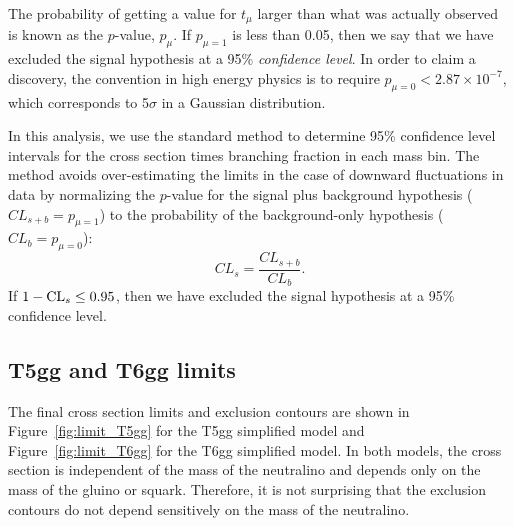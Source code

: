 The probability of getting a value for $t_\mu$ larger than what was actually observed is known as the $p$-value, 
$p_\mu$. If $p_{\mu=1}$ is less than 0.05, then we say that we have excluded the signal hypothesis at a 95\% 
\textit{confidence level}. In order to claim a discovery, the convention in high energy physics is to require
$p_{\mu =0} < 2.87 \times 10^{-7}$, which corresponds to 5$\sigma$ in a Gaussian distribution. 

In this analysis, we use the standard \cls method \cite{Junk:1999kv, Read:2002hq} to 
determine 95\% confidence level intervals for the cross section times branching fraction in each mass bin.
The \cls method avoids over-estimating the limits in the case of downward fluctuations in data by
normalizing the $p$-value for the signal plus background hypothesis ($CL_{s+b} = p_{\mu=1}$) to the
probability of the background-only hypothesis ($CL_{b} = p_{\mu=0}$):
\begin{equation}
CL_s = \frac{CL_{s+b}}{CL_{b}}.
\end{equation}
If $1 - \mathrm{CL}_s \leq 0.95$, then we have excluded the signal hypothesis at a 95\% confidence level.

\subsection{T5gg and T6gg limits}
\label{sec:limitResults}

The final cross section limits and exclusion contours are shown in Figure~\ref{fig:limit_T5gg} for the T5gg simplified model
and Figure~\ref{fig:limit_T6gg} for the T6gg simplified model.
In both models, the cross section is independent of the mass of the neutralino and 
depends only on the mass of the gluino or squark. Therefore, it is not surprising that the exclusion contours
do not depend sensitively on the mass of the neutralino. 

